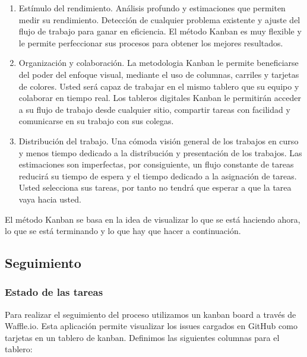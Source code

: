 \documentclass[a4paper,11pt]{article}
\begin{document}
\begin{enumerate}
  \item Estímulo del rendimiento. Análisis profundo y estimaciones que permiten medir su rendimiento. Detección de cualquier problema existente y ajuste del flujo de trabajo para ganar en eficiencia. El método Kanban es muy flexible y le permite perfeccionar sus procesos para obtener los mejores resultados.

  \item Organización y colaboración. La metodologia Kanban le permite beneficiarse del poder del enfoque visual, mediante el uso de columnas, carriles y tarjetas de colores. Usted será capaz de trabajar en el mismo tablero que su equipo y colaborar en tiempo real. Los tableros digitales Kanban le permitirán acceder a su flujo de trabajo desde cualquier sitio, compartir tareas con facilidad y comunicarse en su trabajo con sus colegas.

  \item Distribución del trabajo. Una cómoda visión general de los trabajos en curso y menos tiempo dedicado a la distribución y presentación de los trabajos. Las estimaciones son imperfectas, por consiguiente, un flujo constante de tareas reducirá su tiempo de espera y el tiempo dedicado a la asignación de tareas. Usted selecciona sus tareas, por tanto no tendrá que esperar a que la tarea vaya hacia usted.
\end{enumerate}

El método Kanban se basa en la idea de visualizar lo que se está haciendo ahora, lo que se está terminando y lo que hay que hacer a continuación.

\subsection{Seguimiento}

\subsubsection{Estado de las tareas}

Para realizar el seguimiento del proceso utilizamos un kanban board a través de Waffle.io\cite{waffle}. Esta aplicación permite visualizar los issues cargados en GitHub como tarjetas en un tablero de kanban. Definimos las siguientes columnas para el tablero:
\end{document}
